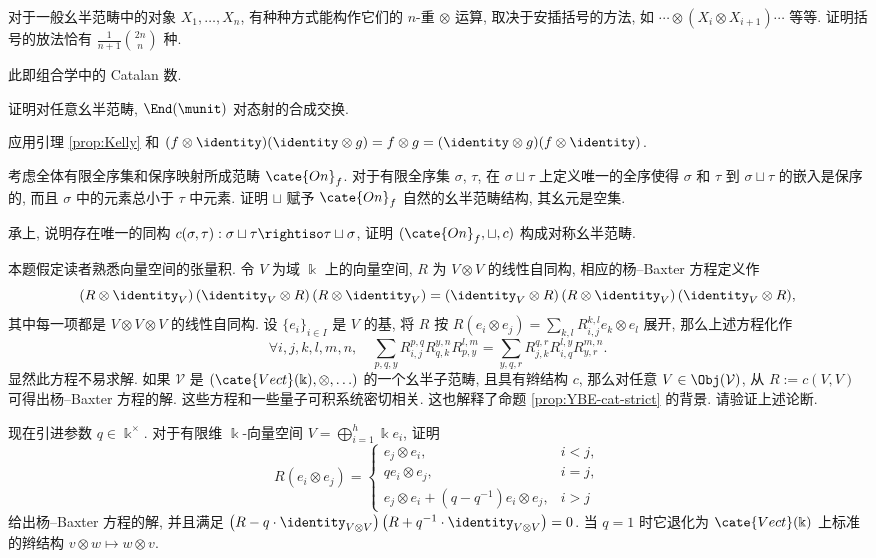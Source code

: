 \begin{Exercises}
	\item 对于一般幺半范畴中的对象 $X_1, \ldots, X_n$, 有种种方式能构作它们的 $n$-重 $\otimes$ 运算, 取决于安插括号的方法, 如 $\cdots \otimes (X_i \otimes X_{i+1}) \cdots$ 等等. 证明括号的放法恰有 $\frac{1}{n+1} \binom{2n}{n}$ 种. \begin{hint} 此即组合学中的 Catalan 数. \end{hint}
	\item 证明对任意幺半范畴, $\End(\munit)$ 对态射的合成交换. \begin{hint} 应用引理 \ref{prop:Kelly} 和 $(f \otimes \identity)(\identity \otimes g) = f \otimes g = (\identity \otimes g) (f \otimes \identity)$.\end{hint}
	\item 考虑全体有限全序集和保序映射所成范畴 $\cate{On}_f$. 对于有限全序集 $\sigma$, $\tau$, 在 $\sigma \sqcup \tau$ 上定义唯一的全序使得 $\sigma$ 和 $\tau$ 到 $\sigma \sqcup \tau$ 的嵌入是保序的, 而且 $\sigma$ 中的元素总小于 $\tau$ 中元素. 证明 $\sqcup$ 赋予 $\cate{On}_f$ 自然的幺半范畴结构, 其幺元是空集.
	\item 承上, 说明存在唯一的同构 $c(\sigma, \tau): \sigma \sqcup \tau \rightiso \tau \sqcup \sigma$, 证明 $(\cate{On}_f, \sqcup, c)$ 构成对称幺半范畴.
	\item 本题假定读者熟悉向量空间的张量积. 令 $V$ 为域 $\Bbbk$ 上的向量空间, $R$ 为 $V \otimes V$ 的线性自同构, 相应的杨--Baxter 方程定义作
		\[ (R \otimes \identity_V) \, (\identity_V \otimes R) \, (R \otimes \identity_V) = (\identity_V \otimes R) \, (R \otimes \identity_V) \, (\identity_V \otimes R) , \]
		其中每一项都是 $V \otimes V \otimes V$ 的线性自同构. 设 $\{e_i\}_{i \in I}$ 是 $V$ 的基, 将 $R$ 按 $R(e_i \otimes e_j) = \sum_{k,l} R^{k,l}_{i,j} e_k \otimes e_l$ 展开, 那么上述方程化作
		\[ \forall i,j,k,l,m,n, \quad \sum_{p,q,y} R^{p,q}_{i,j} R^{y,n}_{q,k} R^{l,m}_{p,y} = \sum_{y,q,r} R^{q,r}_{j,k} R^{l,y}_{i,q} R^{m,n}_{y,r}.  \]
		显然此方程不易求解. 如果 $\mathcal{V}$ 是 $(\cate{Vect}(\Bbbk), \otimes, \ldots)$ 的一个幺半子范畴, 且具有辫结构 $c$, 那么对任意 $V \in \Obj(\mathcal{V})$, 从 $R := c(V,V)$ 可得出杨--Baxter 方程的解. 这些方程和一些量子可积系统密切相关. 这也解释了命题 \ref{prop:YBE-cat-strict} 的背景. 请验证上述论断.
		
		现在引进参数 $q \in \Bbbk^\times$. 对于有限维 $\Bbbk$-向量空间 $V = \bigoplus_{i=1}^h \Bbbk e_i$, 证明
		\[ R(e_i \otimes e_j) = \begin{cases}
			e_j \otimes e_i, & i < j, \\
			q e_i \otimes e_j, & i = j, \\
			e_j \otimes e_i + (q - q^{-1}) e_i \otimes e_j, & i > j
		\end{cases} \]
		给出杨--Baxter 方程的解, 并且满足 $\left( R - q \cdot \identity_{V \otimes V} \right) \left( R + q^{-1} \cdot \identity_{V \otimes V} \right) = 0$. 当 $q=1$ 时它退化为 $\cate{Vect}(\Bbbk)$ 上标准的辫结构 $v \otimes w \mapsto w \otimes v$. 


\end{Exercises}
